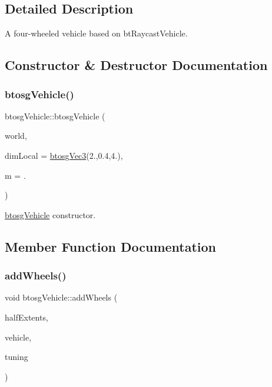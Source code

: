 \subsection{Detailed Description}
A four-\/wheeled vehicle based on bt\+Raycast\+Vehicle. 

\subsection{Constructor \& Destructor Documentation}
\mbox{\label{classbtosgVehicle_aa754dd94553b8690763e4c24d1f26227}} 
\subsubsection{\texorpdfstring{btosg\+Vehicle()}{btosgVehicle()}}
{\footnotesize\ttfamily btosg\+Vehicle\+::btosg\+Vehicle (\begin{DoxyParamCaption}\item[{\hyperlink{classbtosgWorld}{btosg\+World} $\ast$}]{world,  }\item[{\hyperlink{classbtosgVec3}{btosg\+Vec3}}]{dim\+Local = {\ttfamily \hyperlink{classbtosgVec3}{btosg\+Vec3}(2.,0.4,4.)},  }\item[{double}]{m = {.} }\end{DoxyParamCaption})\hspace{0.3cm}{\ttfamily [inline]}}

\hyperlink{classbtosgVehicle}{btosg\+Vehicle} constructor. 

\subsection{Member Function Documentation}
\mbox{\label{classbtosgVehicle_a98971fb952c08cb72341a0c333fc66de}} 
\subsubsection{\texorpdfstring{add\+Wheels()}{addWheels()}}
{\footnotesize\ttfamily void btosg\+Vehicle\+::add\+Wheels (\begin{DoxyParamCaption}\item[{bt\+Vector3 $\ast$}]{half\+Extents,  }\item[{bt\+Raycast\+Vehicle $\ast$}]{vehicle,  }\item[{bt\+Raycast\+Vehicle\+::bt\+Vehicle\+Tuning}]{tuning }\end{DoxyParamCaption})\hspace{0.3cm}{\ttfamily [inline]}}

